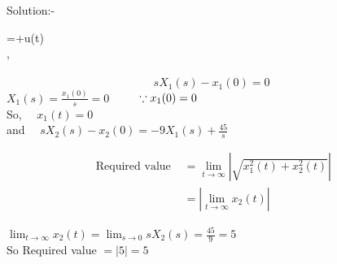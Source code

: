 \documentclass[journal,12pt,twocolumn]{IEEEtran}
\begin{document}
\begin{frame}{Solution:- }
\begin{frame}{}
=\left[\begin{array}{cc}
{0} & {0} \\
{0} & {-9}
\end{array}\right]\left[\begin{array}{l}
{x_{1}(t)} \\
{x_{2}(t)}
\end{array}\right]+\left[\begin{array}{c}
{0} \\
{45}
\end{array}\right] u(t) \vspace{5mm}\\
,\\
\\  
$$
s X_{1}(s)-x_{1}(0)=0
$$
$X_{1}(s)=\frac{x_{1}(0)}{s}=0 \quad$     $\text \quad \because x_{1}(0)=0$
\\So, $\quad x_{1}(t)=0$\\
and $\quad s X_{2}(s)-x_{2}(0)=-9 X_{1}(s)+\frac{45}{s}$


\end{frame}

\begin{frame}{}
$$
\begin{aligned}
\text { Required value } &=\lim _{t \rightarrow \infty}|\sqrt{x_{1}^{2}(t)+x_{2}^{2}(t)}| \\
&=\left|\lim _{t \rightarrow \infty} x_{2}(t)\right|
\end{aligned}
$$

$\lim _{t \rightarrow \infty} x_{2}(t)=\lim _{s \rightarrow 0} s X_{2}(s)=\frac{45}{9}=5$ \vspace{5mm}\\
$\mathrm{So}$
Required value $=|5|=5$
\end{frame}


\end{frame}
\end{document}
